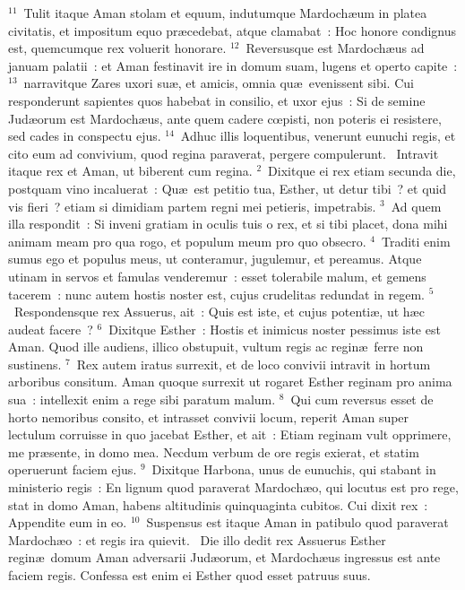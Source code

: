 ${}^{11}$~Tulit itaque Aman stolam et equum, indutumque Mardoch\ae um in platea civitatis, et impositum equo pr\ae cedebat, atque clamabat~: Hoc honore condignus est, quemcumque rex voluerit honorare.
${}^{12}$~Reversusque est Mardoch\ae us ad januam palatii~: et Aman festinavit ire in domum suam, lugens et operto capite~:
${}^{13}$~narravitque Zares uxori su\ae , et amicis, omnia qu\ae\ evenissent sibi. Cui responderunt sapientes quos habebat in consilio, et uxor ejus~: Si de semine Jud\ae orum est Mardoch\ae us, ante quem cadere cœpisti, non poteris ei resistere, sed cades in conspectu ejus.
${}^{14}$~Adhuc illis loquentibus, venerunt eunuchi regis, et cito eum ad convivium, quod regina paraverat, pergere compulerunt.
~\lettrine[lines=10,image=true,loversize=0.05,lraise=-0.03]{I}{}ntravit itaque rex et Aman, ut biberent cum regina.
${}^{2}$~Dixitque ei rex etiam secunda die, postquam vino incaluerat~: Qu\ae\ est petitio tua, Esther, ut detur tibi~? et quid vis fieri~? etiam si dimidiam partem regni mei petieris, impetrabis.
${}^{3}$~Ad quem illa respondit~: Si inveni gratiam in oculis tuis o rex, et si tibi placet, dona mihi animam meam pro qua rogo, et populum meum pro quo obsecro.
${}^{4}$~Traditi enim sumus ego et populus meus, ut conteramur, jugulemur, et pereamus. Atque utinam in servos et famulas venderemur~: esset tolerabile malum, et gemens tacerem~: nunc autem hostis noster est, cujus crudelitas redundat in regem.
${}^{5}$~Respondensque rex Assuerus, ait~: Quis est iste, et cujus potenti\ae , ut h\ae c audeat facere~?
${}^{6}$~Dixitque Esther~: Hostis et inimicus noster pessimus iste est Aman. Quod ille audiens, illico obstupuit, vultum regis ac regin\ae\ ferre non sustinens.
${}^{7}$~Rex autem iratus surrexit, et de loco convivii intravit in hortum arboribus consitum. Aman quoque surrexit ut rogaret Esther reginam pro anima sua~: intellexit enim a rege sibi paratum malum.
${}^{8}$~Qui cum reversus esset de horto nemoribus consito, et intrasset convivii locum, reperit Aman super lectulum corruisse in quo jacebat Esther, et ait~: Etiam reginam vult opprimere, me pr\ae sente, in domo mea. Necdum verbum de ore regis exierat, et statim operuerunt faciem ejus.
${}^{9}$~Dixitque Harbona, unus de eunuchis, qui stabant in ministerio regis~: En lignum quod paraverat Mardoch\ae o, qui locutus est pro rege, stat in domo Aman, habens altitudinis quinquaginta cubitos. Cui dixit rex~: Appendite eum in eo.
${}^{10}$~Suspensus est itaque Aman in patibulo quod paraverat Mardoch\ae o~: et regis ira quievit.
~\lettrine[lines=10,image=true,loversize=0.05,lraise=-0.03]{D}{}ie illo dedit rex Assuerus Esther regin\ae\ domum Aman adversarii Jud\ae orum, et Mardoch\ae us ingressus est ante faciem regis. Confessa est enim ei Esther quod esset patruus suus.
